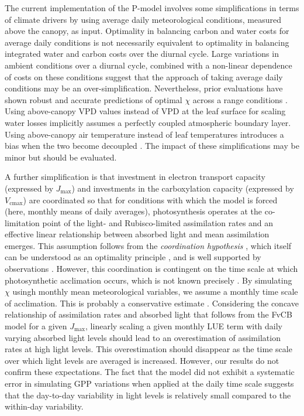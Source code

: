 \documentclass{myreport}
\newcommand{\vcmax}{$V_{\text{cmax}}$}
\newcommand{\jmax}{$J_{\text{max}}$}
\begin{document}
The current implementation of the P-model involves some simplifications in terms of climate drivers by using average daily meteorological conditions, measured above the canopy, as input. Optimality in balancing carbon and water costs for average daily conditions is not necessarily equivalent to optimality in balancing integrated water and carbon costs over the diurnal cycle. Large variations in ambient conditions over a diurnal cycle, combined with a non-linear dependence of costs on these conditions suggest that the approach of taking average daily conditions may be an over-simplification. Nevertheless, prior evaluations have shown robust and accurate predictions of optimal $\chi$ across a range conditions \citep{wang17natpl}. Using above-canopy VPD values instead of VPD at the leaf surface for scaling water losses implicitly assumes a perfectly coupled atmospheric boundary layer. Using above-canopy air temperature instead of leaf temperatures introduces a bias when the two become decoupled \citep{michaletz15tee}. The impact of these simplifications may be minor but should be evaluated. %

A further simplification is that investment in electron transport capacity (expressed by \jmax ) and investments in the carboxylation capacity (expressed by \vcmax ) are coordinated so that for conditions with which the model is forced (here, monthly means of daily averages), photosynthesis operates at the co-limitation point of the light- and Rubisco-limited assimilation rates and an effective linear relationship between absorbed light and mean assimilation emerges. This assumption follows from the \textit{coordination hypothesis} \citep{chen93, haxeltine96}, which itself can be understood as an optimality principle \citep{haxeltine96}, and is well supported by observations \citep{maire12po}. However, this coordination is contingent on the time scale at which photosynthetic acclimation occurs, which is not known precisely  \citep{smithdukes13gcb, way14}. By simulating $\chi$ usingh monthly mean meteorological variables, we assume a monthly time scale of acclimation. This is probably a conservative estimate \citep{smithdukes17, veres84}. Considering the concave relationship of assimilation rates and absorbed light that follows from the FvCB model for a given \jmax , linearly scaling a given monthly LUE term with daily varying absorbed light levels should lead to an overestimation of assimilation rates at high light levels. This overestimation should disappear as the time scale over which light levels are averaged is increased. However, our results do not confirm these expectations. The fact that the model did not exhibit a systematic error in simulating GPP variations when applied at the daily time scale suggests that the day-to-day variability in light levels is relatively small compared to the within-day variability.
\end{document}
